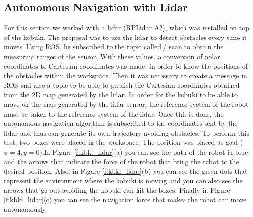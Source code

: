 \documentclass[conference]{IEEEtran}
\begin{document}
\subsection{Autonomous Navigation with Lidar}
For this section we worked with a lidar (RPLidar A2), which was installed on top of the kobuki. The proposal was to use the lidar to detect obstacles every time it moves.
Using ROS, he subscribed to the topic called / scan to obtain the measuring ranges of the sensor. With these values, a conversion of polar coordinates to Cartesian coordinates was made, in order to know the positions of the obstacles within the workspace. Then it was necessary to create a message in ROS and also a topic to be able to publish the Cartesian coordinates obtained from the 2D map generated by the lidar.
In order for the kobuki to be able to move on the map generated by the lidar sensor, the reference system of the robot must be taken to the reference system of the lidar. Once this is done, the autonomous navigation algorithm is subscribed to the coordinates sent by the lidar and thus can generate its own trajectory avoiding obstacles.
To perform this test, two boxes were placed in the workspace. The position was placed as goal ($ x = 4, y = 0 $).In Figure \ref{f:kbki_lidar}(a) you can see the path of the robot in blue and the arrows that indicate the force of the robot that bring the robot to the desired position. Also, in Figure \ref{f:kbki_lidar}(b) you can see the green dots that represent the environment where the kobuki is moving and you can also see the arrows that go out avoiding the kobuki can hit the boxes. Finally in Figure \ref{f:kbki_lidar}(c) you can see the navigation force that makes the robot can move autonomously.
\end{document}
